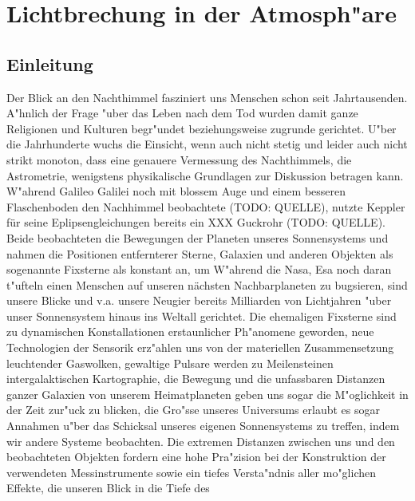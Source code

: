 \chapter{Lichtbrechung in der Atmosph"are\label{chapter:thema}}
\begin{refsection}

\printbibliography[heading=subbibliography]
\end{refsection}


\section{Einleitung}
Der Blick an den Nachthimmel fasziniert uns Menschen schon seit Jahrtausenden. A"hnlich der Frage "uber das Leben nach dem Tod wurden damit ganze Religionen
und Kulturen begr"undet beziehungsweise zugrunde gerichtet. 
U"ber die Jahrhunderte wuchs die Einsicht, wenn auch nicht stetig und leider auch nicht strikt monoton, dass eine genauere Vermessung des Nachthimmels, die Astrometrie, 
wenigstens physikalische Grundlagen zur Diskussion betragen kann. W"ahrend Galileo Galilei noch mit blossem Auge und einem besseren Flaschenboden den Nachhimmel  
beobachtete (TODO: QUELLE), nutzte Keppler für seine Eplipsengleichungen bereits ein XXX Guckrohr (TODO: QUELLE). Beide beobachteten die Bewegungen der Planeten unseres Sonnensystems und 
nahmen die Positionen entfernterer Sterne, Galaxien und anderen Objekten als sogenannte Fixsterne als konstant an, um W"ahrend die Nasa, Esa noch daran t"ufteln einen 
Menschen auf unseren nächsten Nachbarplaneten zu bugsieren, sind unsere Blicke und v.a. unsere Neugier bereits Milliarden von Lichtjahren "uber unser Sonnensystem 
hinaus ins Weltall gerichtet. Die ehemaligen Fixsterne sind zu dynamischen Konstallationen erstaunlicher Ph"anomene geworden, neue Technologien der Sensorik erz"ahlen 
uns von der materiellen Zusammensetzung leuchtender Gaswolken, gewaltige Pulsare werden zu Meilensteinen intergalaktischen Kartographie, die Bewegung und die unfassbaren
Distanzen ganzer Galaxien von unserem Heimatplaneten geben uns sogar die M"oglichkeit in der Zeit zur"uck zu blicken, die Gro"sse unseres Universums  erlaubt es sogar 
Annahmen u"ber das Schicksal unseres eigenen Sonnensystems zu treffen, indem wir andere Systeme beobachten. Die extremen Distanzen zwischen uns und den beobachteten 
Objekten fordern eine hohe Pra"zision bei der Konstruktion der verwendeten Messinstrumente sowie ein tiefes Versta"ndnis aller mo"glichen Effekte, die unseren Blick in die Tiefe des 
